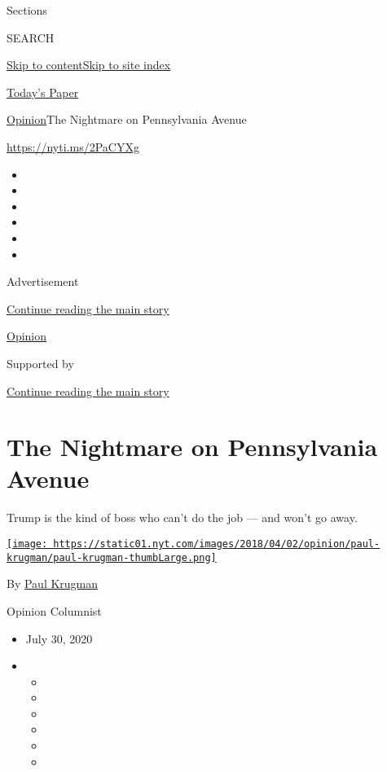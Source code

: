 Sections

SEARCH

\protect\hyperlink{site-content}{Skip to
content}\protect\hyperlink{site-index}{Skip to site index}

\href{https://myaccount.nytimes.com/auth/login?response_type=cookie\&client_id=vi}{}

\href{https://www.nytimes.com/section/todayspaper}{Today's Paper}

\href{/section/opinion}{Opinion}\textbar{}The Nightmare on Pennsylvania
Avenue

\href{https://nyti.ms/2PaCYXg}{https://nyti.ms/2PaCYXg}

\begin{itemize}
\item
\item
\item
\item
\item
\item
\end{itemize}

Advertisement

\protect\hyperlink{after-top}{Continue reading the main story}

\href{/section/opinion}{Opinion}

Supported by

\protect\hyperlink{after-sponsor}{Continue reading the main story}

\hypertarget{the-nightmare-on-pennsylvania-avenue}{%
\section{The Nightmare on Pennsylvania
Avenue}\label{the-nightmare-on-pennsylvania-avenue}}

Trump is the kind of boss who can't do the job --- and won't go away.

\href{https://www.nytimes.com/by/paul-krugman}{\texttt{[image: https://static01.nyt.com/images/2018/04/02/opinion/paul-krugman/paul-krugman-thumbLarge.png]}}

By \href{https://www.nytimes.com/by/paul-krugman}{Paul Krugman}

Opinion Columnist

\begin{itemize}
\item
  July 30, 2020
\item
  \begin{itemize}
  \item
  \item
  \item
  \item
  \item
  \item
  \end{itemize}
\end{itemize}

